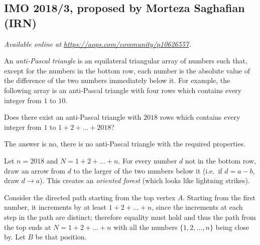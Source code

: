 \documentclass[11pt]{scrartcl}
\begin{document}
\subsection{IMO 2018/3, proposed by Morteza Saghafian (IRN)}
\textsl{Available online at \url{https://aops.com/community/p10626557}.}
\begin{mdframed}[style=mdpurplebox,frametitle={Problem statement}]
An \emph{anti-Pascal triangle} is an equilateral triangular array
of numbers such that, except for the numbers in the bottom row,
each number is the absolute value of the difference
of the two numbers immediately below it.
For example, the following array is an anti-Pascal triangle
with four rows which contains every integer from $1$ to $10$.
\begin{center}
\end{center}
Does there exist an anti-Pascal triangle with $2018$ rows
which contains every integer from $1$ to $1+2+\dots +2018$?
\end{mdframed}
The answer is no, there is no anti-Pascal triangle
with the required properties.

Let $n = 2018$ and $N = 1+2+\dots+n$.
For every number $d$ not in the bottom row,
draw an arrow from $d$ to the larger of the two numbers below it
(i.e.\ if $d=a-b$, draw $d \to a$).
This creates an \emph{oriented forest} (which looks like lightning strikes).

Consider the directed path starting from the top vertex $A$.
Starting from the first number, it increments by at least $1+2+\dots+n$,
since the increments at each step in the path are distinct;
therefore equality must hold
and thus the path from the top ends at $N = 1+2+\dots+n$
with all the numbers $\{1,2,\dots,n\}$ being close by.
Let $B$ be that position.
\end{document}
